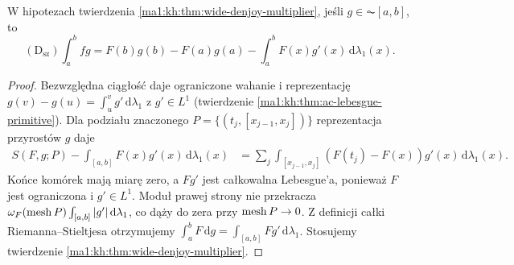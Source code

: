\begin{wniosek}\label{ma1:kh:cor:wide-denjoy-ibp-ac}
W hipotezach twierdzenia \ref{ma1:kh:thm:wide-denjoy-multiplier}, jeśli $g\in\AC[a,b]$, to
\[
 (\mathrm D_{\mathrm{sz}})\int_a^b fg
 =F(b)g(b)-F(a)g(a)-\int_a^b F(x)g'(x)\,\mathrm d\lambda_1(x).
\]
\end{wniosek}
\begin{proof}
Bezwzględna ciągłość daje ograniczone wahanie i reprezentację $g(v)-g(u)=\int_u^v g'\,\mathrm d\lambda_1$ z $g'\in L^1$ (twierdzenie \ref{ma1:kh:thm:ac-lebesgue-primitive}). Dla podziału znaczonego $P=\{(t_j,[x_{j-1},x_j])\}$
reprezentacja przyrostów $g$ daje
\[
\begin{aligned}
 S(F,g;P)-\int_{[a,b]}F(x)g'(x)\,\mathrm d\lambda_1(x)
 &=\sum_j\int_{[x_{j-1},x_j]}
 (F(t_j)-F(x))g'(x)\,\mathrm d\lambda_1(x).
\end{aligned}
\]
Końce komórek mają miarę zero, a $Fg'$ jest całkowalna
Lebesgue'a, ponieważ $F$ jest ograniczona i $g'\in L^1$.
Moduł prawej strony nie przekracza
$\omega_F(\operatorname{mesh} P)\int_{[a,b]}|g'|\,\mathrm d\lambda_1$,
co dąży do zera przy $\operatorname{mesh} P\to0$.
Z definicji całki Riemanna--Stieltjesa otrzymujemy
$\int_a^b F\,\mathrm dg=\int_{[a,b]}Fg'\,\mathrm d\lambda_1$. Stosujemy twierdzenie \ref{ma1:kh:thm:wide-denjoy-multiplier}.
\end{proof}

